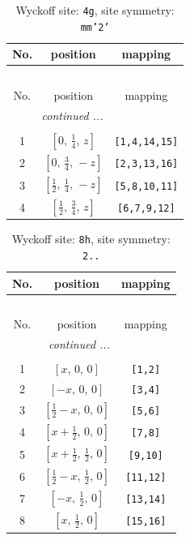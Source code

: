 \documentclass[fleqn,8pt]{jsarticle}
\begin{document}
\renewcommand{\arraystretch}{1.2}
\begin{longtable}{ccc}
\caption{Wyckoff site: {\tt 4g}, site symmetry: {\tt mm'2'}}
 \\
 \hline \hline
No. & position & mapping \\ \hline \endfirsthead

\multicolumn{2}{l}{\tablename\ \thetable{}} \\
 \hline \hline
No. & position & mapping \\ \hline \endhead

 \hline \hline
\multicolumn{2}{r}{\footnotesize\it continued ...} \\ \endfoot

 \hline \hline
\multicolumn{2}{r}{} \\ \endlastfoot

1 & $\left[ 0,\, \frac{1}{4},\, z \right]$ & {\tt [1,4,14,15]} \\ \hline
2 & $\left[ 0,\, \frac{3}{4},\, - z \right]$ & {\tt [2,3,13,16]} \\ \hline
3 & $\left[ \frac{1}{2},\, \frac{1}{4},\, - z \right]$ & {\tt [5,8,10,11]} \\ \hline
4 & $\left[ \frac{1}{2},\, \frac{3}{4},\, z \right]$ & {\tt [6,7,9,12]} \\
\end{longtable}
\renewcommand{\arraystretch}{1.2}
\begin{longtable}{ccc}
\caption{Wyckoff site: {\tt 8h}, site symmetry: {\tt 2..}}
 \\
 \hline \hline
No. & position & mapping \\ \hline \endfirsthead

\multicolumn{2}{l}{\tablename\ \thetable{}} \\
 \hline \hline
No. & position & mapping \\ \hline \endhead

 \hline \hline
\multicolumn{2}{r}{\footnotesize\it continued ...} \\ \endfoot

 \hline \hline
\multicolumn{2}{r}{} \\ \endlastfoot

1 & $\left[ x,\, 0,\, 0 \right]$ & {\tt [1,2]} \\ \hline
2 & $\left[ - x,\, 0,\, 0 \right]$ & {\tt [3,4]} \\ \hline
3 & $\left[ \frac{1}{2} - x,\, 0,\, 0 \right]$ & {\tt [5,6]} \\ \hline
4 & $\left[ x + \frac{1}{2},\, 0,\, 0 \right]$ & {\tt [7,8]} \\ \hline
5 & $\left[ x + \frac{1}{2},\, \frac{1}{2},\, 0 \right]$ & {\tt [9,10]} \\ \hline
6 & $\left[ \frac{1}{2} - x,\, \frac{1}{2},\, 0 \right]$ & {\tt [11,12]} \\ \hline
7 & $\left[ - x,\, \frac{1}{2},\, 0 \right]$ & {\tt [13,14]} \\ \hline
8 & $\left[ x,\, \frac{1}{2},\, 0 \right]$ & {\tt [15,16]} \\
\end{longtable}
\end{document}
